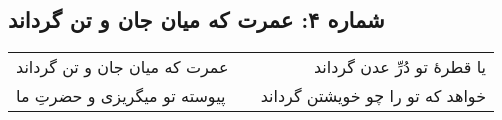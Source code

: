 \begin{center}
\section*{شماره ۴: عمرت که میان جان و تن گرداند}
\label{sec:004}
\begin{longtable}{l p{0.5cm} r}
عمرت که میان جان و تن گرداند
&&
یا قطرهٔ تو دُرِّ عدن گرداند
\\
پیوسته تو میگریزی و حضرتِ ما
&&
خواهد که تو را چو خویشتن گرداند
\\
\end{longtable}
\end{center}
